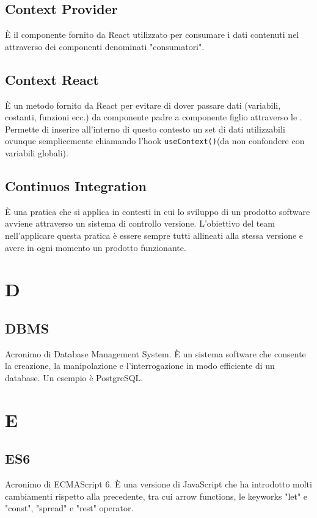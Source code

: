 \subsection*{Context Provider}
È il componente fornito da React utilizzato per consumare i dati contenuti nel  attraverso dei componenti denominati "consumatori".

\subsection*{Context React}
È un metodo fornito da React per evitare di dover passare dati (variabili, costanti, funzioni ecc.) da componente padre a componente figlio attraverso le . Permette di inserire all'interno di questo contesto un set di dati utilizzabili ovunque semplicemente chiamando l'hook \texttt{useContext()}(da non confondere con variabili globali).

\subsection*{Continuos Integration}
È una pratica che si applica in contesti in cui lo sviluppo di un prodotto software avviene attraverso un sistema di controllo versione. L'obiettivo del team nell'applicare questa pratica è essere sempre tutti allineati alla stessa versione e avere in ogni momento un prodotto funzionante. 

\section*{D}
\subsection*{DBMS}
Acronimo di Database Management System. È un sistema software che consente la creazione, la manipolazione e l'interrogazione in modo efficiente di un database. Un esempio è PostgreSQL.

\section*{E}
\subsection*{ES6}
Acronimo di ECMAScript 6. È una versione di JavaScript che ha introdotto molti cambiamenti rispetto alla precedente, tra cui arrow functions, le keyworks "let" e "const", "spread" e "rest" operator.  
